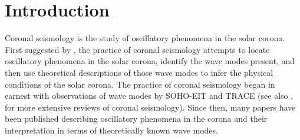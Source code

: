 \documentclass[onecolumn]{emulateapj}
\begin{document}





\section{Introduction}\label{sec:int}
Coronal seismology is the study of oscillatory phenomena in the solar
corona.  First suggested by \cite{1970PASJ...22..341U}, the practice
of coronal seismology attempts to locate oscillatory phenomena in the
solar corona, identify the wave modes present, and then use
theoretical descriptions of those wave modes to infer the physical
conditions of the solar corona.  The practice of coronal seismology
began in earnest with observations of wave modes by SOHO-EIT
\citep{1998ApJ...501L.217D, 1999SoPh..186..207B} and TRACE
\citep{1999ApJ...520..880A} (see also \cite{lrsp-2005-3},
\cite{2012RSPTA.370.3193D} for more extensive reviews of coronal
seismology).  Since then, many papers have been published describing
oscillatory phenomena in the corona and their interpretation in terms
of theoretically known wave modes.
\end{document}
